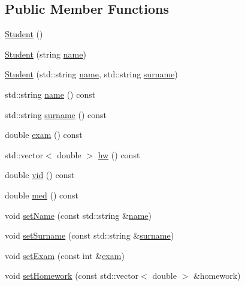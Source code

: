 \subsection*{Public Member Functions}
\begin{DoxyCompactItemize}
\item 
\mbox{\hyperlink{class_student_af9168cedbfa5565cf0b20c1a9d3f5c9d}{Student}} ()
\item 
\mbox{\hyperlink{class_student_aa8659e569d5a87efe8553b439142ad4d}{Student}} (string \mbox{\hyperlink{class_student_a3f64726cb226017b770e4246ca19ba04}{name}})
\item 
\mbox{\hyperlink{class_student_ab2d9c6e05ea5a505708a3d82ece8a5ae}{Student}} (std\+::string \mbox{\hyperlink{class_student_a3f64726cb226017b770e4246ca19ba04}{name}}, std\+::string \mbox{\hyperlink{class_student_addd918dab403a4181f4761b53148855f}{surname}})
\item 
std\+::string \mbox{\hyperlink{class_student_a3f64726cb226017b770e4246ca19ba04}{name}} () const
\item 
std\+::string \mbox{\hyperlink{class_student_addd918dab403a4181f4761b53148855f}{surname}} () const
\item 
double \mbox{\hyperlink{class_student_a88e3713d470d03270d764198c6f6cb17}{exam}} () const
\item 
std\+::vector$<$ double $>$ \mbox{\hyperlink{class_student_aa210ec262bbf18265a03b5300c6a2e54}{hw}} () const
\item 
double \mbox{\hyperlink{class_student_aadb9af906a6e62c80ae87496b718ba01}{vid}} () const
\item 
double \mbox{\hyperlink{class_student_a38b3e368f66757d5ab99fea91e579024}{med}} () const
\item 
void \mbox{\hyperlink{class_student_a489c963162c2b5798154a3217815cfc8}{set\+Name}} (const std\+::string \&\mbox{\hyperlink{class_student_a3f64726cb226017b770e4246ca19ba04}{name}})
\item 
void \mbox{\hyperlink{class_student_a60c08d94f09c69cec567ed399dbafde1}{set\+Surname}} (const std\+::string \&\mbox{\hyperlink{class_student_addd918dab403a4181f4761b53148855f}{surname}})
\item 
void \mbox{\hyperlink{class_student_ae4dfc9ea1f586f44d4f748f667db9ac3}{set\+Exam}} (const int \&\mbox{\hyperlink{class_student_a88e3713d470d03270d764198c6f6cb17}{exam}})
\item 
void \mbox{\hyperlink{class_student_a9f667f98c5b87ad21643090de3d69508}{set\+Homework}} (const std\+::vector$<$ double $>$ \&homework)

\end{DoxyCompactItemize}
